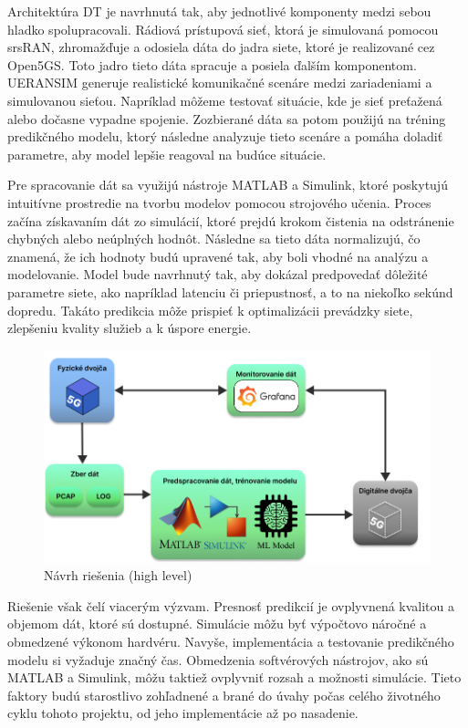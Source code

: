 \par{
Architektúra DT je navrhnutá tak, aby jednotlivé komponenty medzi sebou hladko spolupracovali. Rádiová prístupová sieť, ktorá je simulovaná pomocou srsRAN, zhromažďuje a odosiela dáta do jadra siete, ktoré je realizované cez Open5GS. Toto jadro tieto dáta spracuje a posiela ďalším komponentom. UERANSIM generuje realistické komunikačné scenáre medzi zariadeniami a simulovanou sieťou. Napríklad môžeme testovať situácie, kde je sieť preťažená alebo dočasne vypadne spojenie. Zozbierané dáta sa potom použijú na tréning predikčného modelu, ktorý následne analyzuje tieto scenáre a pomáha doladiť parametre, aby model lepšie reagoval na budúce situácie.
}

\par{
Pre spracovanie dát sa využijú nástroje MATLAB a Simulink, ktoré poskytujú intuitívne prostredie na tvorbu modelov pomocou strojového učenia. Proces začína získavaním dát zo simulácií, ktoré prejdú krokom čistenia na odstránenie chybných alebo neúplných hodnôt. Následne sa tieto dáta normalizujú, čo znamená, že ich hodnoty budú upravené tak, aby boli vhodné na analýzu a modelovanie. Model bude navrhnutý tak, aby dokázal predpovedať dôležité parametre siete, ako napríklad latenciu či priepustnosť, a to na niekoľko sekúnd dopredu. Takáto predikcia môže prispieť k optimalizácii prevádzky siete, zlepšeniu kvality služieb a k úspore energie.
}

\begin{figure}[H]
    \centering
    \includegraphics[width=0.8\linewidth]{assets/images/high-level-model.png}
    \caption{Návrh riešenia (high level)}
\end{figure}

\par{
Riešenie však čelí viacerým výzvam. Presnosť predikcií je ovplyvnená kvalitou a objemom dát, ktoré sú dostupné. Simulácie môžu byť výpočtovo náročné a obmedzené výkonom hardvéru. Navyše, implementácia a testovanie predikčného modelu si vyžaduje značný čas. Obmedzenia softvérových nástrojov, ako sú MATLAB a Simulink, môžu taktiež ovplyvniť rozsah a možnosti simulácie. Tieto faktory budú starostlivo zohľadnené a brané do úvahy počas celého životného cyklu tohoto projektu, od jeho implementácie až po nasadenie.
}

